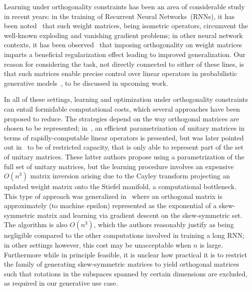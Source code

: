 \documentclass[superscriptaddress,floatfix]{article}
\begin{document}
Learning under orthogonality constraints has been an area of
considerable study in recent years: in the training of Recurrent
Neural Networks~(RNNs), it has been noted~\cite{arjovsky2016unitary}
that such weight matrices, being isometric operators, circumvent the
well-known exploding and vanishing gradient problems; in other neural
network contexts, it has been
observed~\cite{harandi2016generalized,ozay2016optimization,huang2018orthogonal}
that imposing orthogonality on weight matrices imparts a beneficial
regularization effect leading to improved generalization. Our reason
for considering the task, not directly connected to either of these
lines, is that such matrices enable precise control over linear
operators in probabilistic generative
models~\cite{rezende2015variational,papamakarios2019normalizing}, to
be discussed in upcoming work.

In all of these settings, learning and optimization under
orthogonality constraints can entail formidable computational costs,
which several approaches have been proposed to reduce. The strategies
depend on the way orthogonal matrices are chosen to be represented;
in~\cite{arjovsky2016unitary}, an efficient parametrization of unitary
matrices in terms of rapidly-computable linear operators is presented,
but was later pointed out in~\cite{wisdom2016full} to be of restricted
capacity, that is only able to represent part of the set of unitary
matrices. These latter authors propose using a parametrization of the
full set of unitary matrices, but the learning procedure involves an
expensive $O(n^3)$ matrix inversion arising due to the Cayley
transform projecting an updated weight matrix onto the Stiefel
manifold, a computational bottleneck. This type of approach was
generalized in~\cite{lezcano2019cheap} where an orthogonal matrix is
approximately (to machine epsilon) represented as the exponential of a
skew-symmetric matrix and learning via gradient descent on the
skew-symmetric set. The algorithm is also $O(n^3)$, which the authors
reasonably justify as being negligible compared to the other
computations involved in training a long RNN; in other settings
however, this cost may be unacceptable when $n$ is large. Furthermore
while in principle feasible, it is unclear how practical it is to
restrict the family of generating skew-symmetric matrices to yield
orthogonal matrices such that rotations in the subspaces spanned by
certain dimensions are excluded, as required in our generative use
case.
\end{document}
